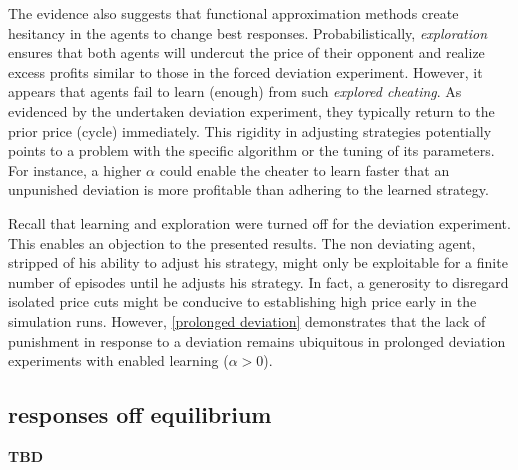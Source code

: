 The evidence also suggests that functional approximation methods create hesitancy in the agents to change best responses. Probabilistically, \emph{exploration} ensures that both agents will undercut the price of their opponent and realize excess profits similar to those in the forced deviation experiment. However, it appears that agents fail to learn (enough) from such \emph{explored cheating}. As evidenced by the undertaken deviation experiment, they typically return to the prior price (cycle) immediately. This rigidity in adjusting strategies potentially points to a problem with the specific algorithm or the tuning of its parameters. For instance, a higher $\alpha$ could enable the cheater to learn faster that an unpunished deviation is more profitable than adhering to the learned strategy. 

Recall that learning and exploration were turned off for the deviation experiment. This enables an objection to the presented results. The non deviating agent, stripped of his ability to adjust his strategy, might only be exploitable for a finite number of episodes until he adjusts his strategy. In fact, a generosity to disregard isolated price cuts might be conducive to establishing high price early in the simulation runs. However, \autoref{prolonged deviation} demonstrates that the lack of punishment in response to a deviation remains ubiquitous in prolonged deviation experiments with enabled learning ($\alpha > 0$).

\subsection{responses off equilibrium}

\textbf{TBD}



